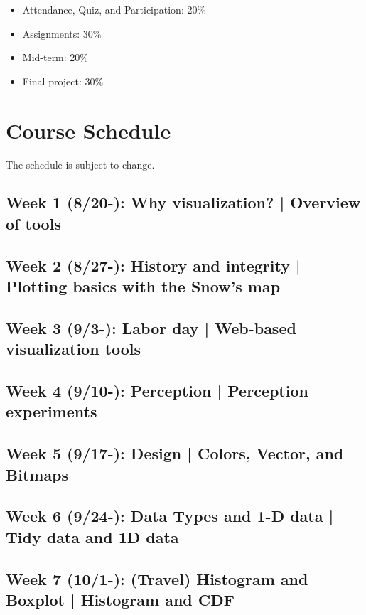 \documentclass[11pt,article,oneside]{memoir} %
\begin{document}
\begin{itemize}%

\item Attendance, Quiz, and Participation: 20\%

\item Assignments: 30\%

\item Mid-term: 20\%

\item Final project: 30\%

\end{itemize}%
\clearpage
\section{Course Schedule}%

The schedule is subject to change. 


\subsection{Week 1 (8/20-): Why visualization? | Overview of tools }
\subsection{Week 2 (8/27-): History and integrity | Plotting basics with the Snow's map }
\subsection{Week 3 (9/3-): Labor day | Web-based visualization tools}
\subsection{Week 4 (9/10-): Perception | Perception experiments }
\subsection{Week 5 (9/17-): Design | Colors, Vector, and Bitmaps }
\subsection{Week 6 (9/24-): Data Types and 1-D data | Tidy data and 1D data } 
\subsection{Week 7 (10/1-): (Travel) Histogram and Boxplot | Histogram and CDF }
\end{document}
